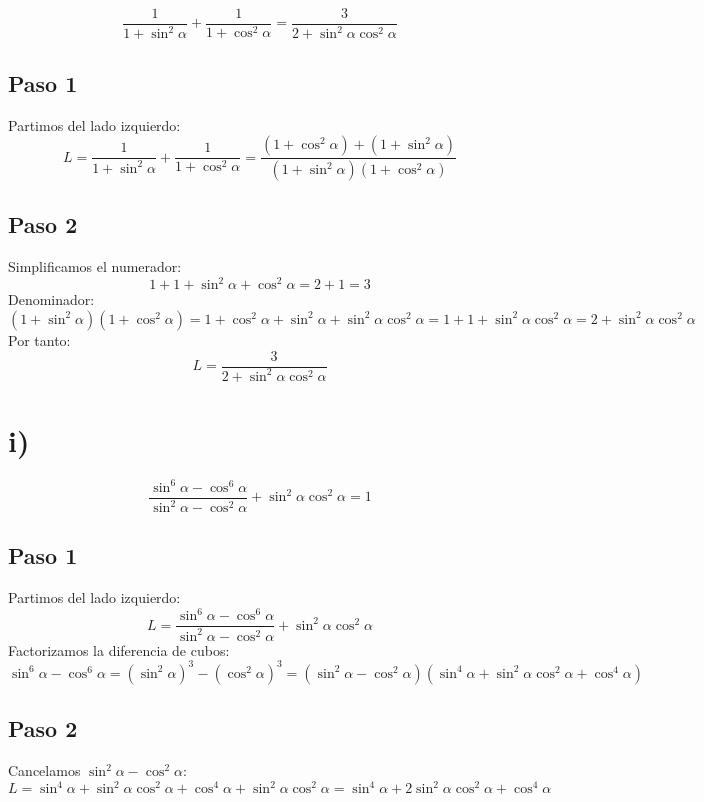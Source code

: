 \documentclass[12pt,a4paper]{article}
\begin{document}
\begin{identidad}
\[
\frac1{1+\sin^2\alpha}
+
\frac1{1+\cos^2\alpha}
=
\frac3{2+\sin^2\alpha\cos^2\alpha}
\]
\end{identidad}

\subsection*{Paso 1}
Partimos del lado izquierdo:
\[
L = \frac1{1+\sin^2\alpha} + \frac1{1+\cos^2\alpha}
= \frac{(1+\cos^2\alpha)+(1+\sin^2\alpha)}{(1+\sin^2\alpha)(1+\cos^2\alpha)}
\]

\subsection*{Paso 2}
Simplificamos el numerador:
\[
1+1 + \sin^2\alpha+\cos^2\alpha = 2 + 1 = 3
\]
Denominador:
\[
(1+\sin^2\alpha)(1+\cos^2\alpha) = 1 + \cos^2\alpha + \sin^2\alpha + \sin^2\alpha\cos^2\alpha
= 1 + 1 + \sin^2\alpha\cos^2\alpha = 2 + \sin^2\alpha\cos^2\alpha
\]
Por tanto:
\[
L = \frac{3}{2+\sin^2\alpha\cos^2\alpha}
\]

\newpage
\section*{i)}

\begin{identidad}
\[
\frac{\sin^6\alpha-\cos^6\alpha}
{\sin^2\alpha-\cos^2\alpha}
+
\sin^2\alpha\cos^2\alpha
=
1
\]
\end{identidad}

\subsection*{Paso 1}
Partimos del lado izquierdo:
\[
L = \frac{\sin^6\alpha-\cos^6\alpha}{\sin^2\alpha-\cos^2\alpha} + \sin^2\alpha\cos^2\alpha
\]
Factorizamos la diferencia de cubos:
\[
\sin^6\alpha-\cos^6\alpha = (\sin^2\alpha)^3 - (\cos^2\alpha)^3
= (\sin^2\alpha-\cos^2\alpha)(\sin^4\alpha + \sin^2\alpha\cos^2\alpha + \cos^4\alpha)
\]

\subsection*{Paso 2}
Cancelamos \(\sin^2\alpha-\cos^2\alpha\):
\[
L = \sin^4\alpha + \sin^2\alpha\cos^2\alpha + \cos^4\alpha + \sin^2\alpha\cos^2\alpha
= \sin^4\alpha + 2\sin^2\alpha\cos^2\alpha + \cos^4\alpha
\]
\end{document}
